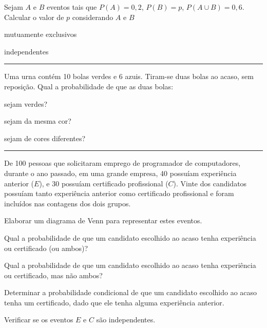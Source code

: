 \documentclass[a4paper,11pt,fleqn]{article}\usepackage[]{graphicx}\usepackage[]{color}
\theoremstyle{definition}
\begin{document}
\begin{compactenum}
\item Sejam $A$ e $B$ eventos tais que $P(A) = 0,2$, $P(B) = p$, $P(A
  \cup B) = 0,6$. Calcular o valor de $p$ considerando $A$ e $B$
  \begin{compactenum}
  \item mutuamente exclusivos
  \item independentes
  \end{compactenum}

\vspace{0.3cm}
\hrule
\vspace{0.3cm}

\item Uma urna contém 10 bolas verdes e 6 azuis. Tiram-se duas bolas ao
  acaso, sem reposição. Qual a probabilidade de que as duas bolas:
  \begin{compactenum}
  \item sejam verdes?
  \item sejam da mesma cor?
  \item sejam de cores diferentes?
  \end{compactenum}

\vspace{0.3cm}
\hrule
\vspace{0.3cm}

\item De 100 pessoas que solicitaram emprego de programador de
  computadores, durante o ano passado, em uma grande empresa, 40
  possuíam experiência anterior ($E$), e 30 possuíam certificado
  profissional ($C$). Vinte dos candidatos possuíam tanto experiência
  anterior como certificado profissional e foram incluídos nas contagens
  dos dois grupos.
  \begin{compactenum}
  \item Elaborar um diagrama de Venn para representar estes eventos.
  \item Qual a probabilidade de que um candidato escolhido ao acaso
    tenha experiência ou certificado (ou ambos)?
  \item Qual a probabilidade de que um candidato escolhido ao acaso
    tenha experiência ou certificado, mas não ambos?
  \item Determinar a probabilidade condicional de que um candidato
    escolhido ao acaso tenha um certificado, dado que ele tenha alguma
    experiência anterior.
  \item Verificar se os eventos $E$ e $C$ são independentes.
  \end{compactenum}


\end{compactenum}
\end{document}
